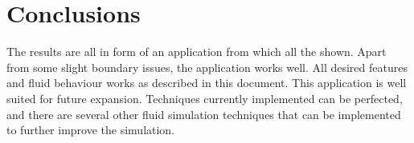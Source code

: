 \chapter{Conclusions}
The results are all in form of an application from which all the shown. Apart from some slight boundary issues, the application works well. All desired features and fluid behaviour works as described in this document. 
This application is well suited for future expansion. Techniques currently implemented can be perfected, and there are several other fluid simulation techniques that can be implemented to further improve the simulation.